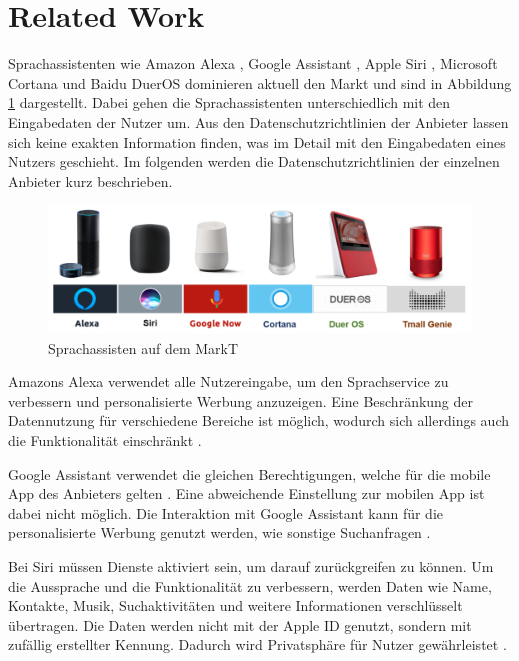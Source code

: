 \section{Related Work}
Sprachassistenten wie Amazon Alexa \cite{alexaAssitent}, Google Assistant \cite{googleAssistant}, Apple Siri \cite{siriAssistent}, Microsoft Cortana \cite{cortanaAssistent} und Baidu DuerOS \cite{baiduAssistant} dominieren aktuell den Markt und sind in Abbildung \ref{fig:sprachassistenten} dargestellt. Dabei gehen die Sprachassistenten unterschiedlich mit den Eingabedaten der Nutzer um. Aus den Datenschutzrichtlinien der Anbieter lassen sich keine exakten Information finden, was im Detail mit den Eingabedaten eines Nutzers geschieht. Im folgenden werden die Datenschutzrichtlinien der einzelnen Anbieter kurz beschrieben.

\begin{figure}[h!]
	\centering
	\includegraphics[width=1\linewidth]{Picture/Sprachassistenten}
	\caption[Sprachassisten auf dem MarkT]{Sprachassisten auf dem MarkT}
	\label{fig:sprachassistenten}
\end{figure}

Amazons Alexa verwendet alle Nutzereingabe, um den Sprachservice zu verbessern und personalisierte Werbung anzuzeigen. Eine Beschränkung der Datennutzung für verschiedene Bereiche ist möglich, wodurch sich allerdings auch die Funktionalität einschränkt \cite{alexaPrivacy}.

Google Assistant verwendet die gleichen Berechtigungen, welche für die mobile App des Anbieters gelten \cite{googleShare}. Eine abweichende Einstellung zur mobilen App ist dabei nicht möglich. Die Interaktion mit Google Assistant kann für die personalisierte Werbung genutzt werden, wie sonstige Suchanfragen \cite{googlePrivacy}.

Bei Siri müssen Dienste aktiviert sein, um darauf zurückgreifen zu können. Um die Aussprache und die Funktionalität zu verbessern, werden Daten wie Name, Kontakte, Musik, Suchaktivitäten und weitere Informationen verschlüsselt übertragen. Die Daten werden nicht mit der Apple ID genutzt, sondern mit zufällig erstellter Kennung. Dadurch wird Privatsphäre für Nutzer gewährleistet \cite{siriPrivacy}.

